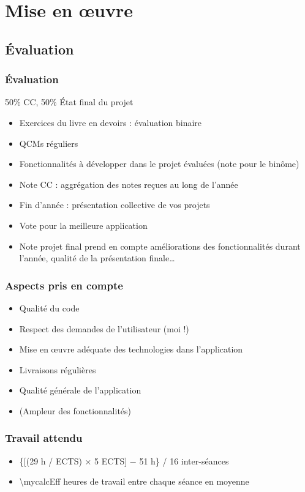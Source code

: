 \documentclass[english, french]{beamer}
\begin{document}
\section{Mise en œuvre}
\subsection{Évaluation}
\begin{frame}
	\frametitle{Évaluation}
	50\% CC, 50\% État final du projet
	\begin{itemize}
		\item Exercices du livre en devoirs : évaluation binaire
		\item QCMs réguliers
		\item Fonctionnalités à développer dans le projet évaluées (note pour le binôme)
		\item Note CC : aggrégation des notes reçues au long de l’année
		\item Fin d’année : présentation collective de vos projets
		\item Vote pour la meilleure application
		\item Note projet final prend en compte améliorations des fonctionnalités durant l’année, qualité de la présentation finale…
	\end{itemize}
\end{frame}

\begin{frame}
	\frametitle{Aspects pris en compte}
	\begin{itemize}
		\item Qualité du code 
		\item Respect des demandes de l’utilisateur (moi !)
		\item Mise en œuvre adéquate des technologies dans l’application
		\item Livraisons régulières
		\item Qualité générale de l’application
		\item (Ampleur des fonctionnalités)
	\end{itemize}
\end{frame}

\begin{frame}
	\frametitle{Travail attendu}
	\begin{itemize}
		\item \{[(29 h / ECTS) × 5 ECTS] − 51 h\} / 16 inter-séances
		\item \num[round-mode=places, round-precision=0, mode=text]{\mycalcEff} heures de travail entre chaque séance en moyenne
	\end{itemize}
\end{frame}
\end{document}
